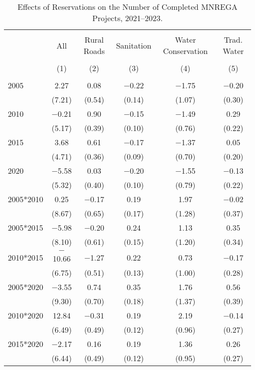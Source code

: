 \begin{table}[!htbp]
\centering
\begin{threeparttable}

  \caption{Effects of Reservations on the Number of Completed MNREGA Projects, 2021--2023.} 
  \label{main_mnrega_2011_2023_all} 
\scriptsize 
\begin{tabular}{@{\extracolsep{0pt}}lccccc} 
\\[-1.8ex]\hline 
\hline \\[-1.8ex] 
 & All & Rural Roads & Sanitation & Water Conservation & Trad. Water \\ 
\\[-1.8ex] & (1) & (2) & (3) & (4) & (5)\\ 
\hline \\[-1.8ex] 
 2005 & 2.27 & 0.08 & $-$0.22 & $-$1.75 & $-$0.20 \\ 
  & (7.21) & (0.54) & (0.14) & (1.07) & (0.30) \\ 
  2010 & $-$0.21 & 0.90 & $-$0.15 & $-$1.49 & 0.29 \\ 
  & (5.17) & (0.39) & (0.10) & (0.76) & (0.22) \\ 
  2015 & 3.68 & 0.61 & $-$0.17 & $-$1.37 & 0.05 \\ 
  & (4.71) & (0.36) & (0.09) & (0.70) & (0.20) \\ 
  2020 & $-$5.58 & 0.03 & $-$0.20 & $-$1.55 & $-$0.13 \\ 
  & (5.32) & (0.40) & (0.10) & (0.79) & (0.22) \\ 
  2005*2010 & 0.25 & $-$0.17 & 0.19 & 1.97 & $-$0.02 \\ 
  & (8.67) & (0.65) & (0.17) & (1.28) & (0.37) \\ 
  2005*2015 & $-$5.98 & $-$0.20 & 0.24 & 1.13 & 0.35 \\ 
  & (8.10) & (0.61) & (0.15) & (1.20) & (0.34) \\ 
  2010*2015 & $-$10.66 & $-$1.27 & 0.22 & 0.73 & $-$0.17 \\ 
  & (6.75) & (0.51) & (0.13) & (1.00) & (0.28) \\ 
  2005*2020 & $-$3.55 & 0.74 & 0.35 & 1.76 & 0.56 \\ 
  & (9.30) & (0.70) & (0.18) & (1.37) & (0.39) \\ 
  2010*2020 & 12.84 & $-$0.31 & 0.19 & 2.19 & $-$0.14 \\ 
  & (6.49) & (0.49) & (0.12) & (0.96) & (0.27) \\ 
  2015*2020 & $-$2.17 & 0.16 & 0.19 & 1.36 & 0.26 \\ 
  & (6.44) & (0.49) & (0.12) & (0.95) & (0.27) \\ 

\end{tabular}
\end{threeparttable}
\end{table}
